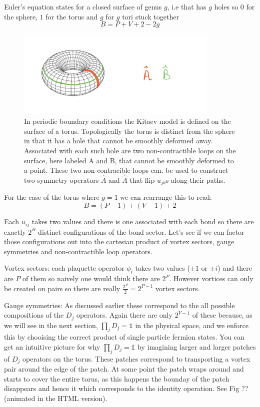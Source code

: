Euler's equation states for a closed surface of genus \(g\), i.e that
has \(g\) holes so \(0\) for the sphere, \(1\) for the torus and \(g\)
for \(g\) tori stuck together \[B = P + V + 2 - 2g\]

\begin{figure}
\hypertarget{fig:torus}{%
\centering
\includegraphics[width=0.86\textwidth,height=\textheight]{figure_code/amk_chapter/torus.jpeg}
\caption{In periodic boundary conditions the Kitaev model is defined on
the surface of a torus. Topologically the torus is distinct from the
sphere in that it has a hole that cannot be smoothly deformed away.
Associated with each such hole are two non-contractible loops on the
surface, here labeled A and B, that cannot be smoothly deformed to a
point. These two non-contracible loops can. be used to construct two
symmetry operators \(\hat{A}\) and \(\hat{A}\) that flip \(u_{jk}\)s
along their paths.}\label{fig:torus}
}
\end{figure}

For the case of the torus where \(g = 1\) we can rearrange this to read:
\[B = (P-1) + (V-1) + 2\]

Each \(u_{ij}\) takes two values and there is one associated with each
bond so there are exactly \(2^B\) distinct configurations of the bond
sector. Let's see if we can factor those configurations out into the
cartesian product of vortex sectors, gauge symmetries and
non-contractible loop operators.

Vortex sectors: each plaquette operator \(\phi_i\) takes two values
(\(\pm 1\) or \(\pm i\)) and there are \(P\) of them so naively one
would think there are \(2^P\). However vortices can only be created on
pairs so there are really \(\tfrac{2^P}{2} = 2^{P-1}\) vortex sectors.

Gauge symmetries: As discussed earlier these correspond to the all
possible compositions of the \(D_j\) operators. Again there are only
\(2^{V-1}\) of these because, as we will see in the next section,
\(\prod_{j} D_j = \mathbb{1}\) in the physical space, and we enforce
this by chooising the correct product of single particle fermion states.
You can get an intuitive picture for why \(\prod_{j} D_j = \mathbb{1}\)
by imagining larger and larger patches of \(D_j\) operators on the
torus. These patches correspond to transporting a vortex pair around the
edge of the patch. At some point the patch wraps around and starts to
cover the entire torus, as this happens the bounday of the patch
disappears and hence it which corresponds to the identity operation. See
Fig ?? (animated in the HTML version).

